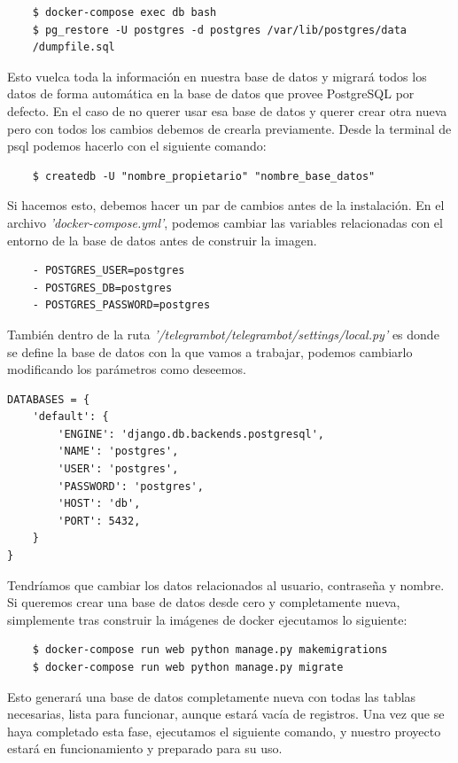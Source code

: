 \begin{verbatim}
    $ docker-compose exec db bash
    $ pg_restore -U postgres -d postgres /var/lib/postgres/data
    /dumpfile.sql
\end{verbatim}

Esto vuelca toda la información en nuestra base de datos y migrará todos los datos de forma automática en la base de datos que provee PostgreSQL por defecto. En el caso de no querer usar esa base de datos y querer crear otra nueva pero con todos los cambios debemos de crearla previamente. Desde la terminal de psql podemos hacerlo con el siguiente comando:

\begin{verbatim}
    $ createdb -U "nombre_propietario" "nombre_base_datos"
\end{verbatim}

Si hacemos esto, debemos hacer un par de cambios antes de la instalación. En el archivo \textit{'docker-compose.yml'}, podemos cambiar las variables relacionadas con el entorno de la base de datos antes de construir la imagen.

\begin{verbatim}
    - POSTGRES_USER=postgres
    - POSTGRES_DB=postgres
    - POSTGRES_PASSWORD=postgres
\end{verbatim}

También dentro de la ruta \textit{'/telegrambot/telegrambot/settings/local.py'} es donde se define la base de datos con la que vamos a trabajar, podemos cambiarlo modificando los parámetros como deseemos. 


\begin{verbatim}
DATABASES = {
    'default': {
        'ENGINE': 'django.db.backends.postgresql',
        'NAME': 'postgres',
        'USER': 'postgres',
        'PASSWORD': 'postgres',
        'HOST': 'db',
        'PORT': 5432,
    }
}
\end{verbatim}

Tendríamos que cambiar los datos relacionados al usuario, contraseña y nombre. Si queremos crear una base de datos desde cero y completamente nueva, simplemente tras construir la imágenes de docker ejecutamos lo siguiente:

\begin{verbatim}
    $ docker-compose run web python manage.py makemigrations
    $ docker-compose run web python manage.py migrate
\end{verbatim}

Esto generará una base de datos completamente nueva con todas las tablas necesarias, lista para funcionar, aunque estará vacía de registros. Una vez que se haya completado esta fase, ejecutamos el siguiente comando, y nuestro proyecto estará en funcionamiento y preparado para su uso.

